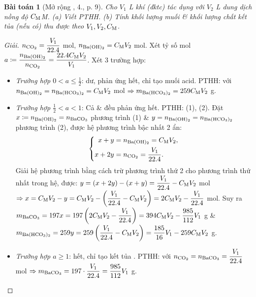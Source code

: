 \documentclass{article}
\newtheorem{baitoan}{Bài toán}
\begin{document}
\begin{baitoan}[Mở rộng \cite{SGK_Hoa_Hoc_9}, 4., p. 9]
	Cho $V_1$ {\rm L} khí {\rm{}} (đktc) tác dụng với $V_2$ {\rm L} dung dịch {\rm{}} nồng độ $C_{\rm M}${\rm M}. (a) Viết {\rm PTHH}. (b) Tính khối lượng muối \& khối lượng chất kết tủa (nếu có) thu được theo $V_1,V_2,C_{\rm M}$.
\end{baitoan}

\begin{proof}[Giải]
	$n_{\ce{CO2}} = \dfrac{V_1}{22.4}$ mol, $n_{\ce{Ba(OH)2}} = C_{\rm M}V_2$ mol. Xét tỷ số mol $a\coloneqq\dfrac{n_{\ce{Ba(OH)2}}}{n_{\ce{CO2}}} = \dfrac{22.4C_{\rm M}V_2}{V_1}$. Xét 3 trường hợp:
	\begin{itemize}
		\item \textit{Trường hợp $0 < a\le\frac{1}{2}$}:  dư,  phản ứng hết, chỉ tạo muối acid. PTHH:  với $n_{\ce{Ba(OH)2}} = n_{\ce{Ba(HCO3)2}} = C_{\rm M}V_2$ mol $\Rightarrow m _{\ce{Ba(HCO3)2}} = 259C_{\rm M}V_2$ g.
		\item \textit{Trường hợp $\frac{1}{2} < a < 1$}: Cả  \&  đều phản ứng hết. PTHH:  (1),  (2). Đặt $x\coloneqq n_{\ce{Ba(OH)2}} = n_{\ce{BaCO3}}$ phương trình (1) \& $y = n_{\ce{Ba(OH)2}} = n_{\ce{Ba(HCO3)2}}$ phương trình (2), được hệ phương trình bậc nhất 2 ẩn:
		\begin{equation*}
			\left\{\begin{split}
				x + y &= n_{\ce{Ba(OH)2}} = C_{\rm M}V_2,\\
				x + 2y &= n_{\ce{CO2}} = \dfrac{V_1}{22.4}.
			\end{split}\right.
		\end{equation*}
		Giải hệ phương trình bằng cách trừ phương trình thứ 2 cho phương trình thứ nhất trong hệ, được: $y = (x + 2y) - (x + y) = \dfrac{V_1}{22.4} - C_{\rm M}V_2$ mol $\Rightarrow x = C_{\rm M}V_2 - y = C_{\rm M}V_2 - \left(\dfrac{V_1}{22.4} - C_{\rm M}V_2\right) = 2C_{\rm M}V_2 - \dfrac{V_1}{22.4}$ mol. Suy ra $m_{\ce{BaCO3}} = 197x = 197\left(2C_{\rm M}V_2 - \dfrac{V_1}{22.4}\right) = 394C_{\rm M}V_2 - \dfrac{985}{112}V_1$ g \&  $m_{\ce{Ba(HCO3)2}} = 259y = 259\left(\dfrac{V_1}{22.4} - C_{\rm M}V_2\right) = \dfrac{185}{16}V_1 - 259C_{\rm M}V_2$ g.
		\item \textit{Trường hợp $a\ge1$}:  hết, chỉ tạo kết tủa . PTHH:  với $n_{\ce{CO2}} = n_{\ce{BaCO3}} = \dfrac{V_1}{22.4}$ mol $\Rightarrow m_{\ce{BaCO3}} = 197\cdot\dfrac{V_1}{22.4} = \dfrac{985}{112}V_1$ g.

\end{itemize}
\end{proof}
\end{document}
